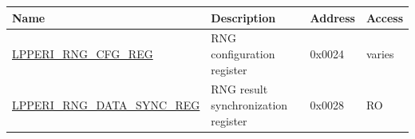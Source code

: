 \begin{longtable}{ | p{6cm} | p{7.2cm} | p{1.3cm} | p{1cm} | }
\hline\rowcolor{lightgray}
\textbf{Name} & \textbf{Description} &  \textbf{Address} & \textbf{Access} \\ \hline
\endhead
\hyperref[regdesc:LPPERIRNGCFGREG]{LPPERI\_RNG\_CFG\_REG} & RNG configuration register & 0x0024 & varies \\ \hline
\hyperref[regdesc:LPPERIRNGSYNCDATAREG]{LPPERI\_RNG\_DATA\_SYNC\_REG} & RNG result synchronization register & 0x0028 & RO \\ \hline
\end{longtable}
